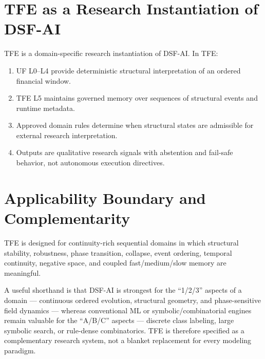\section{TFE as a Research Instantiation of DSF-AI}

TFE is a domain-specific research instantiation of DSF-AI. In TFE:
\begin{enumerate}[leftmargin=1.2cm]
    \item UF L0--L4 provide deterministic structural interpretation of an ordered financial window.
    \item TFE L5 maintains governed memory over sequences of structural events and runtime metadata.
    \item Approved domain rules determine when structural states are admissible for external research interpretation.
    \item Outputs are qualitative research signals with abstention and fail-safe behavior, not autonomous execution directives.
\end{enumerate}

\section{Applicability Boundary and Complementarity}

TFE is designed for continuity-rich sequential domains in which structural stability, robustness, phase transition, collapse, event ordering, temporal continuity, negative space, and coupled fast/medium/slow memory are meaningful.

A useful shorthand is that DSF-AI is strongest for the ``1/2/3'' aspects of a domain --- continuous ordered evolution, structural geometry, and phase-sensitive field dynamics --- whereas conventional ML or symbolic/combinatorial engines remain valuable for the ``A/B/C'' aspects --- discrete class labeling, large symbolic search, or rule-dense combinatorics. TFE is therefore specified as a complementary research system, not a blanket replacement for every modeling paradigm.
